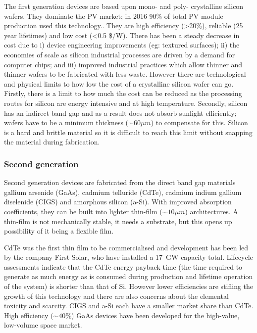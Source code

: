 The first generation devices are based upon mono- and poly- crystalline silicon wafers. They dominate the PV market; in 2016 90\% of total PV module production used this technology.\autocite{Jager-Waldau2017}. They are high efficiency (>20\%), reliable (25 year lifetimes) and low cost (<0.5 \$/W). There has been a steady decrease in cost due to i) device engineering improvements (eg: textured surfaces); ii) the economies of scale as silicon industrial processes are driven by a demand for computer chips; and iii) improved industrial practices which allow thinner and thinner wafers to be fabricated with less waste. However there are technological and physical limits to how low the cost of a crystalline silicon wafer can go. Firstly, there is a limit to how much the cost can be reduced as the processing routes for silicon are energy intensive and at high temperature. Secondly, silicon has an indirect band gap and as a result does not absorb sunlight efficiently; wafers have to be a minimum thickness ($\sim 60\mu m$) to compensate for this. Silicon is a hard and brittle material so it is difficult to reach this limit without snapping the material during fabrication.

\subsubsection{Second generation}

Second generation devices are fabricated from the direct band gap materials gallium arsenide (GaAs), cadmium telluride (CdTe), cadmium indium gallium diselenide (CIGS) and amorphous silicon (a-Si). With improved absorption coefficients, they can be built into lighter thin-film ($\sim 10\mu m$) architectures. A thin-film is not mechanically stable, it needs a substrate, but this opens up possibility of it being a flexible film.

CdTe was the first thin film to be commercialised and development has been led by the company First Solar, who have installed a \SI{17}{\giga\watt} capacity total. Lifecycle assessments indicate that the CdTe energy payback time (the time required to generate as much energy as is consumed during production and lifetime operation of the system) is shorter than that of Si.\autocite{Koppelaar2017} However lower efficiencies are stifling the growth of this technology and there are also concerns about the elemental toxicity and scarcity. CIGS and a-Si each have a smaller market share than CdTe. High efficiency ($\sim 40\%$) GaAs devices have been developed for the high-value, low-volume space market.

